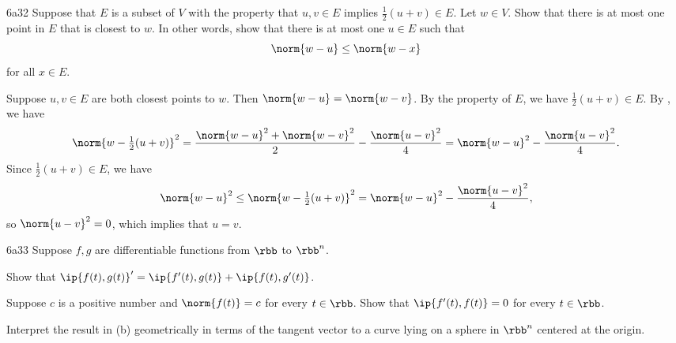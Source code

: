 \begin{exercise}{6a32}
    Suppose that $E$ is a subset of $V$ with the property that $u, v \in E$ implies $\frac{1}{2}(u + v) \in E$.
    Let $w \in V$.
    Show that there is at most one point in $E$ that is closest to $w$.
    In other words, show that there is at most one $u \in E$ such that
    \[
        \norm{w - u} \leq \norm{w - x}
    \]
    for all $x \in E$.
\end{exercise}

\begin{sol}
    Suppose $u, v \in E$ are both closest points to $w$.
    Then $\norm{w - u} = \norm{w - v}$.
    By the property of $E$, we have $\frac{1}{2}(u + v) \in E$.
    By , we have
    \[
        \norm{w - \tfrac{1}{2}(u + v)}^2 = \frac{\norm{w - u}^2 + \norm{w - v}^2}{2} - \frac{\norm{u - v}^2}{4} = \norm{w - u}^2 - \frac{\norm{u - v}^2}{4}.
    \]
    Since $\frac{1}{2}(u + v) \in E$, we have
    \[
        \norm{w - u}^2 \leq \norm{w - \tfrac{1}{2}(u + v)}^2 = \norm{w - u}^2 - \frac{\norm{u - v}^2}{4},
    \]
    so $\norm{u - v}^2 = 0$, which implies that $u = v$.
\end{sol}

\begin{exercise}{6a33}
    Suppose $f, g$ are differentiable functions from $\rbb$ to $\rbb^n$.
    \begin{subexercises}
        \item Show that $\ip{f(t), g(t)}' = \ip{f'(t), g(t)} + \ip{f(t), g'(t)}$.
        \item Suppose $c$ is a positive number and $\norm{f(t)} = c$ for every $t \in \rbb$.
        Show that $\ip{f'(t), f(t)} = 0$ for every $t \in \rbb$.
        \item Interpret the result in (b) geometrically in terms of the tangent vector to a curve lying on a sphere in $\rbb^n$ centered at the origin.
    \end{subexercises}
\end{exercise}

